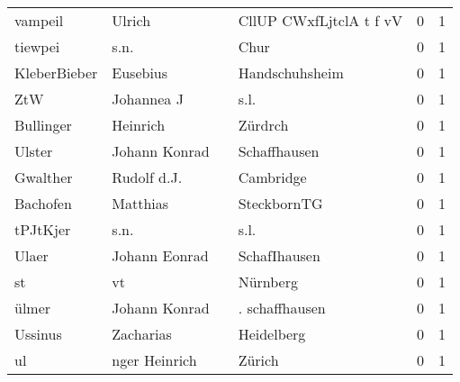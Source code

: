 \documentclass[10pt,a4paper,landscape]{article}
\begin{document}
\begin{longtable}{llllrr}
                  vampeil &                             Ulrich &             &                     CllUP CWxfLjtclA t f vV &          0 &         1 \\
                  tiewpei &                               s.n. &             &                                        Chur &          0 &         1 \\
             KleberBieber &                           Eusebius &             &                              Handschuhsheim &          0 &         1 \\
                      ZtW &                         Johannea J &             &                                        s.l. &          0 &         1 \\
                Bullinger &                           Heinrich &             &                                     Zürdrch &          0 &         1 \\
                   Ulster &                      Johann Konrad &             &                                Schaffhausen &          0 &         1 \\
                 Gwalther &                        Rudolf d.J. &             &                                   Cambridge &          0 &         1 \\
                 Bachofen &                           Matthias &             &                                 SteckbornTG &          0 &         1 \\
                 tPJtKjer &                               s.n. &             &                                        s.l. &          0 &         1 \\
                    Ulaer &                      Johann Eonrad &             &                                SchafIhausen &          0 &         1 \\
                       st &                                 vt &             &                                    Nürnberg &          0 &         1 \\
                    ülmer &                      Johann Konrad &             &                              . schaffhausen &          0 &         1 \\
                  Ussinus &                          Zacharias &             &                                  Heidelberg &          0 &         1 \\
                       ul &                      nger Heinrich &             &                                      Zürich &          0 &         1 \\

\end{longtable}
\end{document}
